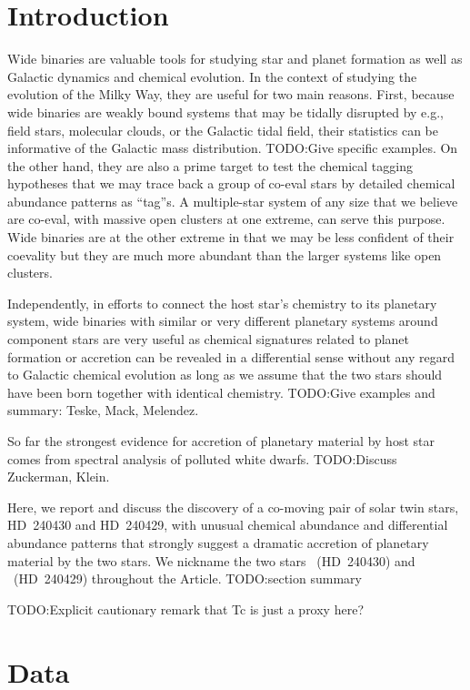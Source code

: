 \documentclass[manuscript]{aastex6}
\newcommand{\documentname}{Article}
\newcommand{\sunanalog}{\text{Krios}}
\newcommand{\bizarreone}{\text{Kronos}}
\newcommand{\todo}[1]{{\color{blue}TODO:#1}}
\begin{document}
\section{Introduction} %
\label{sec:introduction}

Wide binaries are valuable tools for studying star and planet formation as well as
Galactic dynamics and chemical evolution.
In the context of studying the evolution of the Milky Way, they are useful for
two main reasons.
First, because wide binaries are weakly bound systems that may be tidally
disrupted by e.g., field stars, molecular clouds, or the Galactic tidal field,
their statistics can be informative of the Galactic mass distribution.
\todo{Give specific examples.}
On the other hand, they are also a prime target to test the
chemical tagging hypotheses that we may trace back a group of co-eval stars
by detailed chemical abundance patterns as ``tag''s.
A multiple-star system of any size that we believe are co-eval,
with massive open clusters at one extreme, can serve this purpose.
Wide binaries are at the other extreme in that we may be less confident of
their coevality but they are much more abundant than the larger systems like open clusters.

Independently, in efforts to connect the host star's chemistry to
its planetary system, wide binaries with similar or very different planetary systems around
component stars are very useful as chemical signatures related to planet formation or accretion
can be revealed in a differential sense without any regard to Galactic chemical evolution
as long as we assume that the two stars should have been born together with identical chemistry.
\todo{Give examples and summary: Teske, Mack, Melendez.}

So far the strongest evidence for accretion of planetary material by host star comes
from spectral analysis of polluted white dwarfs.
\todo{Discuss Zuckerman, Klein}.

Here, we report and discuss the discovery of a co-moving pair of solar twin stars,
HD~240430 and HD~240429, with unusual chemical abundance and differential abundance patterns
that strongly suggest a dramatic accretion of planetary material by the two stars.
We nickname the two stars \bizarreone\ (HD~240430) and
\sunanalog\ (HD~240429) throughout the \documentname.
\todo{section summary}

\todo{Explicit cautionary remark that Tc is just a proxy here?}


\section{Data}
\label{sec:data}
\end{document}
